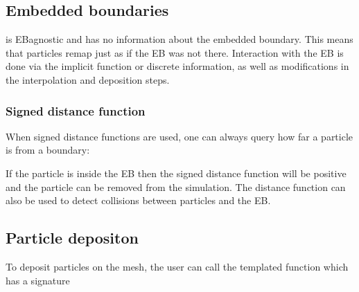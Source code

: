 \documentclass[letterpaper,10pt,english]{sphinxmanual}
\begin{document}
\subsection{Embedded boundaries}
\label{\detokenize{Source/Particles:embedded-boundaries}}
 is EB\sphinxhyphen{}agnostic and has no information about the embedded boundary.
This means that particles remap just as if the EB was not there.
Interaction with the EB is done via the implicit function or discrete information, as well as modifications in the interpolation and deposition steps.


\subsubsection{Signed distance function}
\label{\detokenize{Source/Particles:signed-distance-function}}
When signed distance functions are used, one can always query how far a particle is from a boundary:

\begin{sphinxVerbatim}[commandchars=\\\{\},formatcom=\scriptsize]
 
 

    
                
       

       
\end{sphinxVerbatim}

If the particle is inside the EB then the signed distance function will be positive and the particle can be removed from the simulation.
The distance function can also be used to detect collisions between particles and the EB.


\subsection{Particle depositon}
\label{\detokenize{Source/Particles:particle-depositon}}
To deposit particles on the mesh, the user can call the templated function  which has a signature
\end{document}
